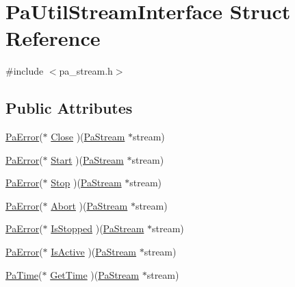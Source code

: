 \hypertarget{struct_pa_util_stream_interface}{}\section{Pa\+Util\+Stream\+Interface Struct Reference}
\label{struct_pa_util_stream_interface}


{\ttfamily \#include $<$pa\+\_\+stream.\+h$>$}

\subsection*{Public Attributes}
\begin{DoxyCompactItemize}
\item 
\hyperlink{portaudio_8h_a4949e4a8ef9f9dbe8cbee414ce69841d}{Pa\+Error}($\ast$ \hyperlink{struct_pa_util_stream_interface_ad2e59fcef6ea37d6243de9521bebdef1}{Close} )(\hyperlink{portaudio_8h_a19874734f89958fccf86785490d53b4c}{Pa\+Stream} $\ast$stream)
\item 
\hyperlink{portaudio_8h_a4949e4a8ef9f9dbe8cbee414ce69841d}{Pa\+Error}($\ast$ \hyperlink{struct_pa_util_stream_interface_acd5390ba9ec8a7eef702d9b08969331f}{Start} )(\hyperlink{portaudio_8h_a19874734f89958fccf86785490d53b4c}{Pa\+Stream} $\ast$stream)
\item 
\hyperlink{portaudio_8h_a4949e4a8ef9f9dbe8cbee414ce69841d}{Pa\+Error}($\ast$ \hyperlink{struct_pa_util_stream_interface_acbc38a842649fb8bca53c398e52f0322}{Stop} )(\hyperlink{portaudio_8h_a19874734f89958fccf86785490d53b4c}{Pa\+Stream} $\ast$stream)
\item 
\hyperlink{portaudio_8h_a4949e4a8ef9f9dbe8cbee414ce69841d}{Pa\+Error}($\ast$ \hyperlink{struct_pa_util_stream_interface_a6025a3448249480366d50eba6870e379}{Abort} )(\hyperlink{portaudio_8h_a19874734f89958fccf86785490d53b4c}{Pa\+Stream} $\ast$stream)
\item 
\hyperlink{portaudio_8h_a4949e4a8ef9f9dbe8cbee414ce69841d}{Pa\+Error}($\ast$ \hyperlink{struct_pa_util_stream_interface_a54ccc28cea56fa30061a23f5566ea905}{Is\+Stopped} )(\hyperlink{portaudio_8h_a19874734f89958fccf86785490d53b4c}{Pa\+Stream} $\ast$stream)
\item 
\hyperlink{portaudio_8h_a4949e4a8ef9f9dbe8cbee414ce69841d}{Pa\+Error}($\ast$ \hyperlink{struct_pa_util_stream_interface_a13997b0b1ff6809baca5b96f35c872eb}{Is\+Active} )(\hyperlink{portaudio_8h_a19874734f89958fccf86785490d53b4c}{Pa\+Stream} $\ast$stream)
\item 
\hyperlink{portaudio_8h_af17a7e6d0471a23071acf8dbd7bbe4bd}{Pa\+Time}($\ast$ \hyperlink{struct_pa_util_stream_interface_a99d3c2b11e527653538915457f6ad002}{Get\+Time} )(\hyperlink{portaudio_8h_a19874734f89958fccf86785490d53b4c}{Pa\+Stream} $\ast$stream)

\end{DoxyCompactItemize}
